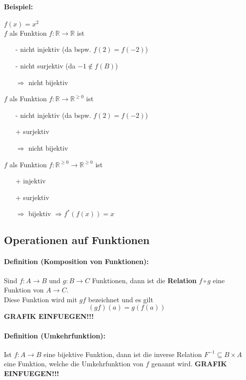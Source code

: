 \paragraph{Beispiel:}$f(x)=x^2$\\
$f$ als Funktion $f:\mathbb{R}\rightarrow\mathbb{R}$ ist
\begin{itemize}
\item[-] nicht injektiv (da bspw. $f(2)=f(-2)$)
\item[-] nicht surjektiv (da $-1\notin f(B)$)
\item[$\Rightarrow$] nicht bijektiv
\end{itemize}
$f$ als Funktion $f:\mathbb{R}\rightarrow\mathbb{R}^{\geq 0}$ ist
\begin{itemize}
\item[-] nicht injektiv (da bspw. $f(2)=f(-2)$)
\item[+] surjektiv
\item[$\Rightarrow$] nicht bijektiv
\end{itemize}
$f$ als Funktion $f:\mathbb{R}^{\geq 0}\rightarrow\mathbb{R}^{\geq 0}$ ist
\begin{itemize}
\item[+] injektiv
\item[+] surjektiv
\item[$\Rightarrow$] bijektiv $\Rightarrow f^{*}(f(x))=x$
\end{itemize}

\subsection{Operationen auf Funktionen}
\paragraph{Definition (Komposition von Funktionen):}Sind $f:A\rightarrow B$ und $g:B\rightarrow C$ Funktionen, dann ist die \textbf{Relation} $f\circ g$ eine Funktion von $A\rightarrow C$.\\
Diese Funktion wird mit $gf$ bezeichnet und es gilt
\[
(gf)(a)=g(f(a))
\]
\textbf{GRAFIK EINFUEGEN!!!}
\paragraph{Definition (Umkehrfunktion):}Ist $f:A\rightarrow B$ eine bijektive Funktion, dann ist die inverse Relation $F^{-1}\subseteq B\times A$ eine Funktion, welche die Umkehrfunktion von $f$ genannt wird.
\textbf{GRAFIK EINFUEGEN!!!}

